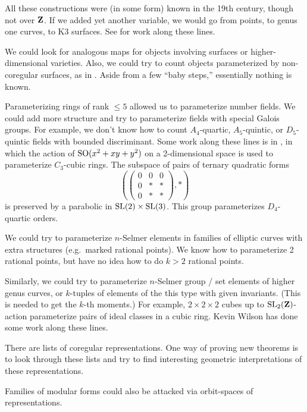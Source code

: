 All these constructions were (in some form) known in the 19th century, though 
not over $\mathbf{Z}$. If we added yet another variable, we would go from points, to 
genus one curves, to K3 surfaces. See \cite{bhk13} for work along these lines. 

We could look for analogous maps for objects involving surfaces or 
higher-dimensional varieties. Also, we could try to count objects parameterized 
by non-coregular surfaces, as in \cite{by13}. Aside from a few ``baby steps,'' 
essentially nothing is known. 

Parameterizing rings of rank $\leqslant 5$ allowed us to parameterize number 
fields. We could add more structure and try to parameterize fields with special 
Galois groups. For example, we don't know how to count $A_4$-quartic, 
$A_5$-quintic, or $D_5$-quintic fields with bounded discriminant. Some work 
along these lines is in \cite{bs13}, in which the action of 
$\operatorname{SO}(x^2+x y+y^2)$ on a 2-dimensional space is used to 
parameterize $C_3$-cubic rings. The subspace of pairs of ternary quadratic 
forms 
\[
  \left(\begin{pmatrix} 0 & 0 & 0 \\ 0 & \ast & \ast \\ 0 & \ast & \ast \end{pmatrix}, \ast \right) 
\]
is preserved by a parabolic in $\operatorname{SL}(2)\times \operatorname{SL}(3)$. 
This group parameterizes $D_4$-quartic orders. 

We could try to parameterize $n$-Selmer elements in families of 
elliptic curves with extra structures (e.g.~marked rational points). We know 
how to parameterize 2 rational points, but have no idea how to do $k>2$ 
rational points. 

Similarly, we could try to parameterize $n$-Selmer group / set elements of 
higher genus curves, or $k$-tuples of elements of the this type with given 
invariants. (This is needed to get the $k$-th moments.) For example, 
$2\times 2\times 2$ cubes up to $\operatorname{SL}_2(\mathbf{Z})$-action parameterize 
pairs of ideal classes in a cubic ring. Kevin Wilson has done some work along 
these lines. 

There are lists of coregular representations. One way of proving new theorems 
is to look through these lists and try to find interesting geometric 
interpretations of these representations. 

Families of modular forms could also be attacked via orbit-spaces of 
representations. 

